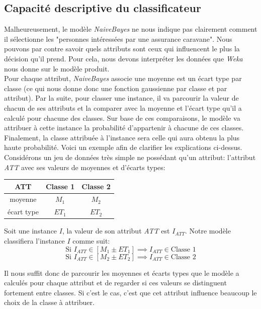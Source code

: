 \documentclass[10pt,a4paper]{article}
\begin{document}
			\subsection{Capacité descriptive du classificateur}
			
				Malheureusement, le modèle \textit{NaiveBayes} ne nous indique pas clairement comment il sélectionne les "personnes intéressées par une assurance caravane". Nous pouvons par contre savoir quels attributs sont ceux qui influencent le plus la décision qu'il prend. Pour cela, nous devons interpréter les données que \textit{Weka} nous donne sur le modèle produit.\\
				
				Pour chaque attribut, \textit{NaiveBayes} associe une moyenne est un écart type par classe (ce qui nous donne donc une fonction gaussienne par classe et par attribut). Par la suite, pour classer une instance, il va parcourir la valeur de chacun de ses attributs et la comparer avec la moyenne et l'écart type qu'il a calculé pour chacune des classes. Sur base de ces comparaisons, le modèle va attribuer à cette instance la probabilité d'appartenir à chacune de ces classes. Finalement, la classe attribuée à l'instance sera celle qui aura obtenu la plus haute probabilité. Voici un exemple afin de clarifier les explications ci-dessus.\\
				
				Considérons un jeu de données très simple ne possédant qu'un attribut: l'attribut \textit{ATT} avec ses valeurs de moyennes et d'écarts types:
				\begin{center}
					\begin{tabular}{c|c c}
						ATT & Classe 1 & Classe 2 \\
						\hline
						moyenne & $M_1$ & $M_2$ \\
						écart type & $ET_1$ & $ET_2$\\
					\end{tabular}
				\end{center}
				
				Soit une instance $I$, la valeur de son attribut \textit{ATT} est $I_{ATT}$. Notre modèle classifiera l'instance $I$ comme suit:
				\[
					\text{Si } I_{ATT} \in [M_1 \pm ET_1] \implies I_{ATT} \in \text{Classe 1}
				\]
				\[
					\text{Si } I_{ATT} \in [M_2 \pm ET_2] \implies I_{ATT} \in \text{Classe 2}
				\]
				
				Il nous suffit donc de parcourir les moyennes et écarts types que le modèle a calculés pour chaque attribut et de regarder si ces valeurs se distinguent fortement entre classes. Si c'est le cas, c'est que cet attribut influence beaucoup le choix de la classe à attribuer.\\
				
\end{document}
